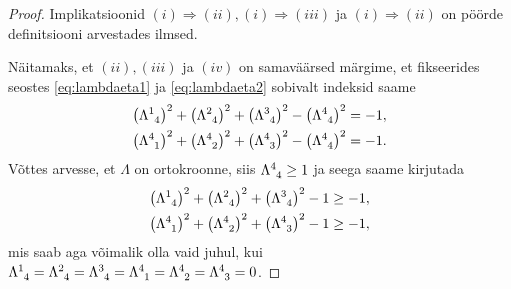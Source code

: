\documentclass[12pt,a4paper,oneside]{article}
\theoremstyle{plain}
\theoremstyle{definition}
\numberwithin{equation}{section}
\begin{document}
\begin{proof}
Implikatsioonid $(i) \Longrightarrow (ii), (i) \Longrightarrow (iii)$ 
ja $(i) \Longrightarrow (ii)$ on pöörde definitsiooni arvestades 
ilmsed.

Näitamaks, et $(ii), (iii)$ ja $(iv)$ on samaväärsed märgime, et 
fikseerides seostes \ref{eq:lambdaeta1} ja \ref{eq:lambdaeta2} 
sobivalt indeksid saame
\begin{align*}
\left(\Lambda\indices{^1_4}\right)^2 + 
	\left(\Lambda\indices{^2_4}\right)^2 + 
	\left(\Lambda\indices{^3_4}\right)^2 - 
	\left(\Lambda\indices{^4_4}\right)^2 = -1, \\
\left(\Lambda\indices{^4_1}\right)^2 + 
	\left(\Lambda\indices{^4_2}\right)^2 + 
	\left(\Lambda\indices{^4_3}\right)^2 - 
	\left(\Lambda\indices{^4_4}\right)^2 = -1.
\end{align*}
Võttes arvesse, et $\Lambda$ on ortokroonne, siis 
$\Lambda\indices{^4_4} \geq 1$ ja seega saame kirjutada
\begin{align*}
\left(\Lambda\indices{^1_4}\right)^2 + 
	\left(\Lambda\indices{^2_4}\right)^2 + 
	\left(\Lambda\indices{^3_4}\right)^2 - 1 \geq -1, \\
\left(\Lambda\indices{^4_1}\right)^2 + 
	\left(\Lambda\indices{^4_2}\right)^2 + 
	\left(\Lambda\indices{^4_3}\right)^2 - 1 \geq -1,
\end{align*}
mis saab aga võimalik olla vaid juhul, kui 
$\Lambda\indices{^1_4} = \Lambda\indices{^2_4} = 
\Lambda\indices{^3_4} = \Lambda\indices{^4_1} = 
\Lambda\indices{^4_2} = \Lambda\indices{^4_3} = 0$.


\end{proof}
\end{document}
